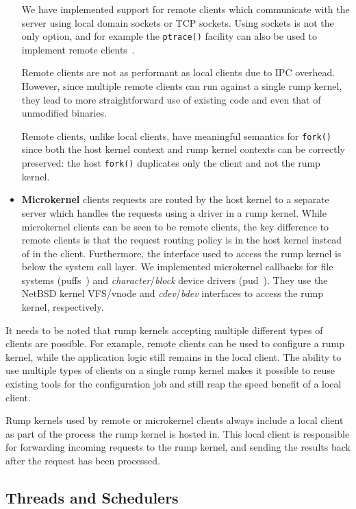 \begin{itemize}
	We have implemented support for remote clients which
	communicate with the server using local domain sockets or TCP
	sockets.  Using sockets is not the only option, and for example
	the \texttt{ptrace()} facility can also be used to implement
	remote clients~\cite{dike:uml,gardenghi:viewos}.

	Remote clients are not as performant as local clients due to
	IPC overhead.
	However, since multiple remote clients can run against a
	single rump kernel, they lead to more straightforward use
	of existing code and even that of unmodified binaries.

	Remote clients, unlike local clients, have meaningful semantics
	for \texttt{fork()} since both the host kernel context and
	rump kernel contexts can be correctly preserved: the host
	\texttt{fork()} duplicates only the client and not the rump
	kernel.

\item   \textbf{Microkernel} clients requests are routed by the host kernel to
	a separate server which handles the requests using a driver in a
	rump kernel.  While microkernel clients can be seen to be remote
	clients, the key difference to remote clients is that the request
	routing policy is in the host kernel instead of in the client.
	Furthermore, the interface used to access the rump kernel
	is below the system call layer.  We implemented microkernel
	callbacks for file systems (puffs~\cite{kantee:puffs})
	and \textit{character}/\textit{block} device drivers
	(pud~\cite{man4:pud}).	They use the NetBSD kernel VFS/vnode
	and \textit{cdev}/\textit{bdev} interfaces to access the rump
	kernel, respectively.
\end{itemize}

It needs to be noted that rump kernels accepting multiple different types
of clients are possible.  For example, remote clients can be used to
configure a rump kernel, while the application logic still remains in
the local client.  The ability to use multiple types of clients on a
single rump kernel makes it possible to reuse existing tools for
the configuration job and still reap the speed benefit of a local client.

Rump kernels used by remote or microkernel clients always include
a local client as part of the process the rump kernel is hosted in.
This local client is responsible for forwarding incoming requests to
the rump kernel, and sending the results back after the request has
been processed.

\subsection{Threads and Schedulers}
\label{sect:procmodel}

